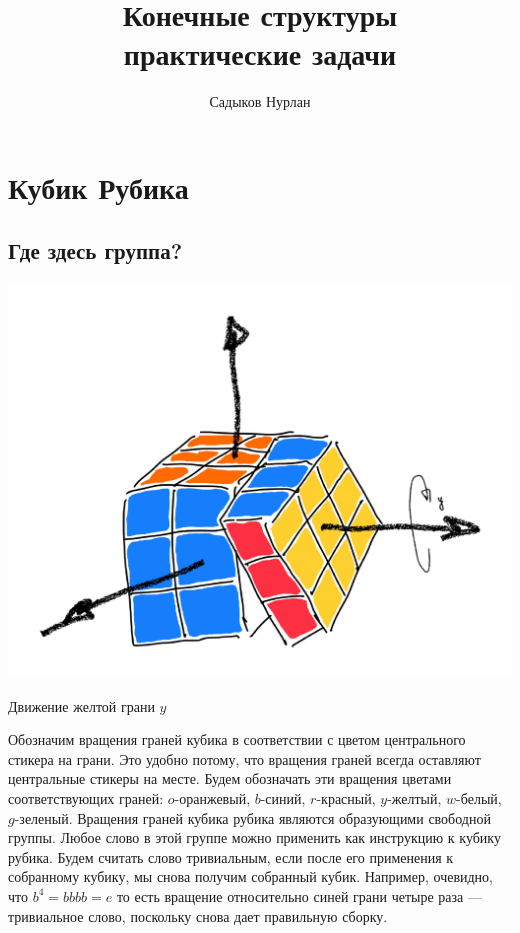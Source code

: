 \documentclass{tufte-book}
\title{Конечные структуры \\ {\Huge практические задачи}} %
\author{Садыков Нурлан}
\begin{document}
\frontmatter

\maketitle  
\chapter{Кубик Рубика}
\section{Где здесь группа?}


\begin{marginfigure}
    \includegraphics[width=1.1\columnwidth]{../pics/rubik_single_move.pdf}
    \caption{Движение желтой грани $y$}
    \label{fig:move_y}
\end{marginfigure}


Обозначим вращения граней кубика в соответствии с
цветом центрального стикера на грани. Это удобно потому, что вращения граней
всегда оставляют центральные стикеры на месте. Будем обозначать эти вращения
цветами соответствующих граней: $o$-оранжевый, $b$-синий, $r$-красный,
$y$-желтый, $w$-белый, $g$-зеленый. Вращения граней кубика рубика являются
образующими свободной группы. Любое слово в этой группе можно применить как
инструкцию к кубику рубика. Будем считать слово тривиальным, если после его
применения к собранному кубику, мы снова получим собранный
кубик. Например, очевидно, что $b^4 = bbbb = e$ то
есть вращение относительно синей грани четыре раза --- тривиальное слово,
поскольку снова дает правильную сборку.
\end{document}
